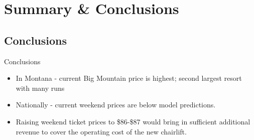 \documentclass{beamer}
\begin{document}
\section{Summary \& Conclusions} %
\subsection{Conclusions}
\begin{frame}{Conclusions}
\begin{itemize}

\item In Montana -  current Big Mountain price is highest; second largest resort with many runs\\
\item Nationally - current weekend prices are below model predictions.\\
\item Raising weekend ticket prices to \$86-\$87 would bring in sufficient additional revenue to cover the operating cost of the new chairlift.\\

\end{itemize}
\end{frame}
\end{document}
